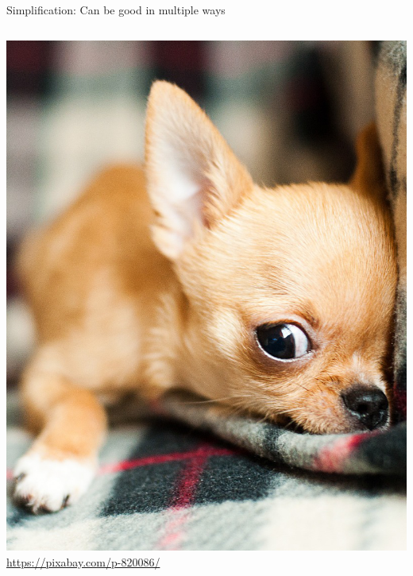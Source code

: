 \documentclass{beamer}
\begin{document}
\begin{frame}{Simplification: Can be good in multiple ways}
\begin{columns}
\begin{column}{0.4\textwidth}
\begin{overprint}
\begin{center}
		\includegraphics[height=0.7\textheight]{Illustrations/chihuahua-smaller} \\
		\tiny \url{https://pixabay.com/p-820086/}
		\end{center} 
		\begin{center}

\end{center}
\end{overprint}
\end{column}
\end{columns}
\end{frame}
\end{document}

